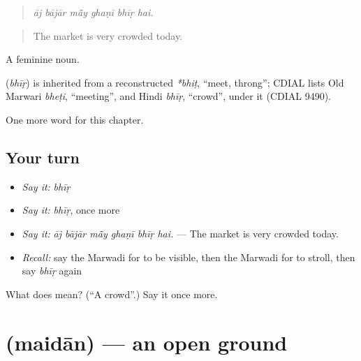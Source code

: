 \begin{quote}
     
\end{quote}

\begin{quote}
\emph{āj bājār mā̃y ghaṇī bhīṛ hai.}
\end{quote}

\begin{quote}
The market is very crowded today.
\end{quote}

A feminine noun.

\begin{cousinweb}
\textbf{} (\emph{bhīṛ}) is inherited from a reconstructed \emph{*bhiṭ}, \textquotedblleft{}meet, throng\textquotedblright{}; CDIAL lists Old Marwari \emph{bheṭi}, \textquotedblleft{}meeting\textquotedblright{}, and Hindi \emph{bhīṛ}, \textquotedblleft{}crowd\textquotedblright{}, under it (CDIAL 9490).
\end{cousinweb}

\begin{grammarlens}[title={What you've built}]
One more word for this chapter.
\end{grammarlens}

\subsection*{Your turn}
\begin{itemize}
\raggedright
  \item \emph{Say it:} \emph{bhīṛ}
  \item \emph{Say it:} \emph{bhīṛ}, once more
  \item \emph{Say it:} \emph{āj bājār mā̃y ghaṇī bhīṛ hai.} — The market is very crowded today.
  \item \emph{Recall:} say the Marwadi for to be visible, then the Marwadi for to stroll, then say \emph{bhīṛ} again
\end{itemize}

\begin{tcolorbox}[breakable,colback=teal!4,colframe=teal!35!black,title={Before you move on}]
What does  mean? (\textquotedblleft{}A crowd\textquotedblright{}.) Say it once more.
\end{tcolorbox}
\section[\texorpdfstring{\mw{मैदान} (maidān)}{मैदान (maidān)}]{ (maidān) — an open ground}

